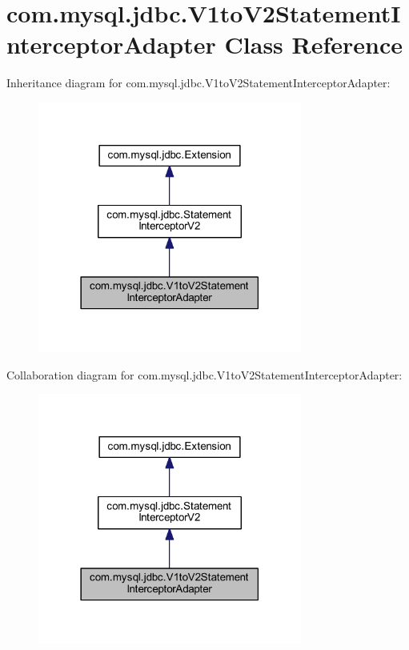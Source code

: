 \hypertarget{classcom_1_1mysql_1_1jdbc_1_1_v1to_v2_statement_interceptor_adapter}{}\section{com.\+mysql.\+jdbc.\+V1to\+V2\+Statement\+Interceptor\+Adapter Class Reference}
\label{classcom_1_1mysql_1_1jdbc_1_1_v1to_v2_statement_interceptor_adapter}


Inheritance diagram for com.\+mysql.\+jdbc.\+V1to\+V2\+Statement\+Interceptor\+Adapter\+:
\nopagebreak
\begin{figure}[H]
\begin{center}
\leavevmode
\includegraphics[width=246pt]{classcom_1_1mysql_1_1jdbc_1_1_v1to_v2_statement_interceptor_adapter__inherit__graph}
\end{center}
\end{figure}


Collaboration diagram for com.\+mysql.\+jdbc.\+V1to\+V2\+Statement\+Interceptor\+Adapter\+:
\nopagebreak
\begin{figure}[H]
\begin{center}
\leavevmode
\includegraphics[width=246pt]{classcom_1_1mysql_1_1jdbc_1_1_v1to_v2_statement_interceptor_adapter__coll__graph}
\end{center}
\end{figure}
